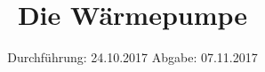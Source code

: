 

\subject{V-206}
\title{Die Wärmepumpe}
\date{%
  Durchführung: 24.10.2017
  \hspace{3em}
  Abgabe: 07.11.2017 
}



\maketitle
\thispagestyle{empty}
\tableofcontents
\newpage







\printbibliography{}


